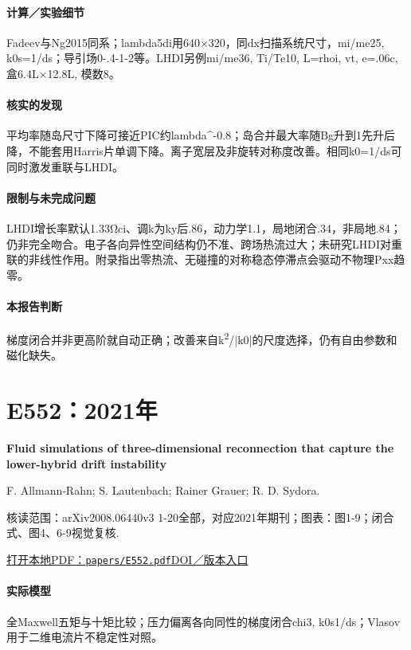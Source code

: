 \paragraph{计算／实验细节}Fadeev与Ng2015同系；lambda5di用640×320，同dx扫描系统尺寸，mi/me25, k0s=1/ds；导引场0-.4-1-2等。LHDI另例mi/me36, Ti/Te10, L=rhoi, vt, e=.06c, 盒6.4L×12.8L, 模数8。

\paragraph{核实的发现}平均率随岛尺寸下降可接近PIC约lambda\textasciicircum{}-0.8；岛合并最大率随Bg升到1先升后降，不能套用Harris片单调下降。离子宽层及非旋转对称度改善。相同k0=1/ds可同时激发重联与LHDI。

\paragraph{限制与未完成问题}LHDI增长率默认1.33Ωci、调k为ky后.86，动力学1.1，局地闭合.34，非局地.84；仍非完全吻合。电子各向异性空间结构仍不准、跨场热流过大；未研究LHDI对重联的非线性作用。附录指出零热流、无碰撞的对称稳态停滞点会驱动不物理Pxx趋零。

\paragraph{本报告判断}梯度闭合并非更高阶就自动正确；改善来自k\textsuperscript{2}/|k0|的尺度选择，仍有自由参数和磁化缺失。

\section{E552：2021年}\label{paper:E552}

\textbf{Fluid simulations of three-dimensional reconnection that capture the lower-hybrid drift instability}\citep{E552}\

F. Allmann‐Rahn;  S. Lautenbach;  Rainer Grauer;  R. D. Sydora.

\textsf{核读范围：}arXiv2008.06440v3 1-20全部，对应2021年期刊；\textsf{图表：}图1-9；闭合式、图4、6-9视觉复核.

\href{run:papers/E552.pdf}{打开本地PDF：\texttt{papers/E552.pdf}}\quad\href{https://doi.org/10.1017/s0022377820001683}{DOI／版本入口}

\paragraph{实际模型}全Maxwell五矩与十矩比较；压力偏离各向同性的梯度闭合chi3, k0s1/ds；Vlasov用于二维电流片不稳定性对照。

